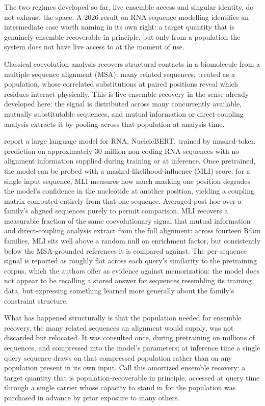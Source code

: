 \documentclass[11pt]{article}
\begin{document}
The two regimes developed so far, live ensemble access and singular identity, do not exhaust the space. A 2026 result on RNA sequence modelling identifies an intermediate case worth naming in its own right: a target quantity that is genuinely ensemble-recoverable in principle, but only from a population the system does not have live access to at the moment of use.

Classical coevolution analysis recovers structural contacts in a biomolecule from a multiple sequence alignment (MSA): many related sequences, treated as a population, whose correlated substitutions at paired positions reveal which residues interact physically. This is live ensemble recovery in the sense already developed here: the signal is distributed across many concurrently available, mutually substitutable sequences, and mutual information or direct-coupling analysis extracts it by pooling across that population at analysis time.

\citet{upadhyay2026nucleicbert} report a large language model for RNA, NucleicBERT, trained by masked-token prediction on approximately 30 million non-coding RNA sequences with no alignment information supplied during training or at inference. Once pretrained, the model can be probed with a masked-likelihood-influence (MLI) score: for a single input sequence, MLI measures how much masking one position degrades the model's confidence in the nucleotide at another position, yielding a coupling matrix computed entirely from that one sequence. Averaged post hoc over a family's aligned sequences purely to permit comparison, MLI recovers a measurable fraction of the same coevolutionary signal that mutual information and direct-coupling analysis extract from the full alignment: across fourteen Rfam families, MLI sits well above a random null on enrichment factor, but consistently below the MSA-grounded references it is compared against. The per-sequence signal is reported as roughly flat across each query's similarity to the pretraining corpus, which the authors offer as evidence against memorization: the model does not appear to be recalling a stored answer for sequences resembling its training data, but expressing something learned more generally about the family's constraint structure.

What has happened structurally is that the population needed for ensemble recovery, the many related sequences an alignment would supply, was not discarded but relocated. It was consulted once, during pretraining on millions of sequences, and compressed into the model's parameters; at inference time a single query sequence draws on that compressed population rather than on any population present in its own input. Call this amortized ensemble recovery: a target quantity that is population-recoverable in principle, accessed at query time through a single carrier whose capacity to stand in for the population was purchased in advance by prior exposure to many others.
\end{document}
